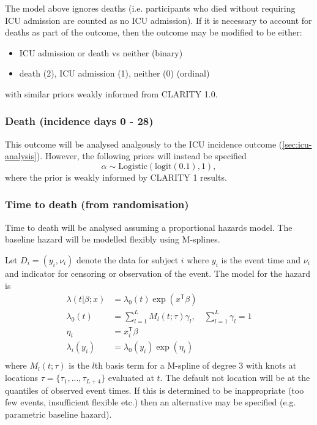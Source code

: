 \documentclass[11pt,parskip=half-]{scrartcl}
\begin{document}
The model above ignores deaths (i.e. participants who died without requiring ICU admission are counted as no ICU admission). If it is necessary to account for deaths as part of the outcome, then the outcome may be modified to be either:
\begin{itemize}
    \item ICU admission or death vs neither (binary)
    \item death (2), ICU admission (1), neither (0) (ordinal)
\end{itemize}
with similar priors weakly informed from CLARITY 1.0.

\subsubsection{Death (incidence days 0 - 28)}
This outcome will be analysed analgously to the ICU incidence outcome (\ref{sec:icu-analysis}). However, the following priors will instead be specified
$$
    \alpha \sim \text{Logistic}(\text{logit}(0.1), 1),
$$
where the prior is weakly informed by CLARITY 1 results.

\subsubsection{Time to death (from randomisation)}
Time to death will be analysed assuming a proportional hazards model. The baseline hazard will be modelled flexibly using M-splines.

Let $D_i = (y_i, \nu_i)$ denote the data for subject $i$ where $y_i$ is the event time and $\nu_i$ and indicator for censoring or observation of the event. The model for the hazard is
$$
    \begin{aligned}
        \lambda(t|\beta;x) & = \lambda_0(t)\exp(x^\mathsf{T}\beta)                           \\
        \lambda_0(t)       & = \sum_{l=1}^L M_l(t;\tau)\gamma_l,\quad \sum_{l=1}^L\gamma_l=1 \\
        \eta_i             & = x_i^\mathsf{T}\beta                                           \\
        \lambda_i(y_i)     & = \lambda_0(y_i)\exp(\eta_i)                                    \\
    \end{aligned}
$$
where $M_l(t;\tau)$ is the $l$th basis term for a M-spline of degree 3 with knots at locations $\tau=\{\tau_1,...,\tau_{L+4}\}$ evaluated at $t$. The default not location will be at the quantiles of observed event times. If this is determined to be inappropriate (too few events, insufficient flexible etc.) then an alternative may be specified (e.g. parametric baseline hazard).
\end{document}
